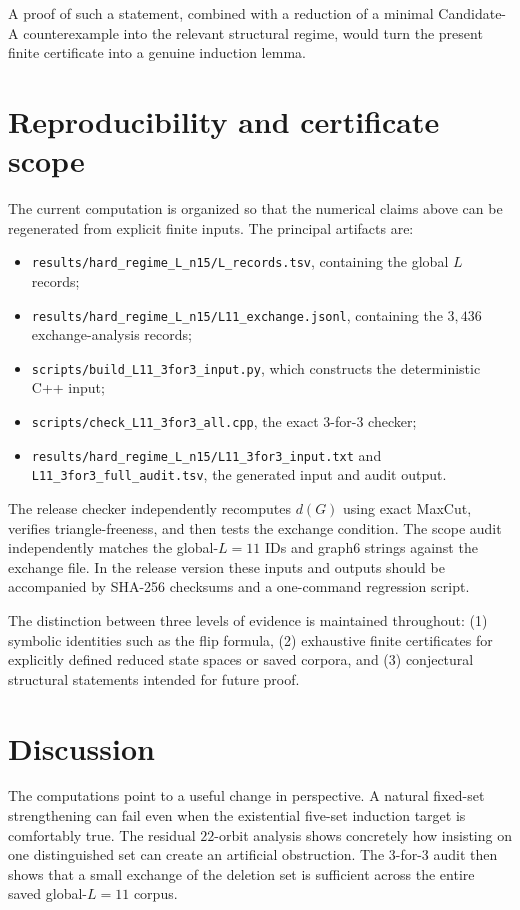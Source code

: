 \documentclass[11pt]{article}
\newcommand{\dd}{d}
\begin{document}
A proof of such a statement, combined with a reduction of a minimal
Candidate-A counterexample into the relevant structural regime, would turn
the present finite certificate into a genuine induction lemma.

\section{Reproducibility and certificate scope}
\label{sec:repro}

The current computation is organized so that the numerical claims above
can be regenerated from explicit finite inputs.  The principal artifacts
are:
\begin{itemize}
\item \texttt{results/hard\_regime\_L\_n15/L\_records.tsv}, containing the
      global $L$ records;
\item \texttt{results/hard\_regime\_L\_n15/L11\_exchange.jsonl}, containing
      the $3{,}436$ exchange-analysis records;
\item \texttt{scripts/build\_L11\_3for3\_input.py}, which constructs the
      deterministic C++ input;
\item \texttt{scripts/check\_L11\_3for3\_all.cpp}, the exact 3-for-3
      checker;
\item \texttt{results/hard\_regime\_L\_n15/L11\_3for3\_input.txt} and
      \texttt{L11\_3for3\_full\_audit.tsv}, the generated input and audit
      output.
\end{itemize}

The release checker independently recomputes $\dd(G)$ using exact MaxCut,
verifies triangle-freeness, and then tests the exchange condition.  The
scope audit independently matches the global-$L=11$ IDs and graph6 strings
against the exchange file.  In the release version these inputs and outputs
should be accompanied by SHA-256 checksums and a one-command regression
script.

The distinction between three levels of evidence is maintained throughout:
(1) symbolic identities such as the flip formula,
(2) exhaustive finite certificates for explicitly defined reduced state
spaces or saved corpora, and
(3) conjectural structural statements intended for future proof.

\section{Discussion}

The computations point to a useful change in perspective.  A natural
fixed-set strengthening can fail even when the existential five-set
induction target is comfortably true.  The residual $22$-orbit analysis
shows concretely how insisting on one distinguished set can create an
artificial obstruction.  The 3-for-3 audit then shows that a small exchange
of the deletion set is sufficient across the entire saved global-$L=11$
corpus.
\end{document}
